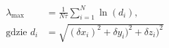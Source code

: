 \begin{align*}
  \lambda_{\text{max}} &= \frac{1}{N \tau} \sum_{i=1}^{N} \ln(d_i), \\
  \text{gdzie } d_i &= \sqrt{(\delta x_i)^2 + \delta y_i)^2 + \delta z_i)^2}
\end{align*}
